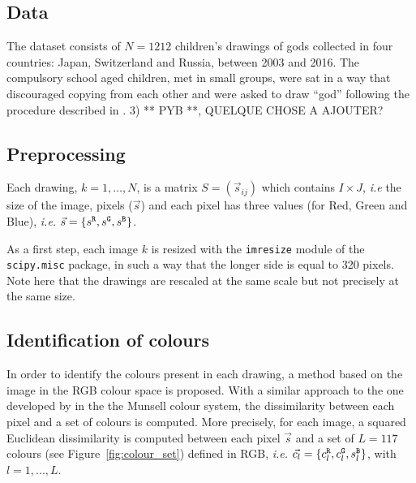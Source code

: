 \documentclass[11pt,a4paper]{article}
\begin{document}
\subsection{Data}
\label{sec:dataset}

The dataset consists of $N = 1212$ children's drawings of gods collected in four countries: Japan, Switzerland and Russia, between 2003 and 2016. The compulsory school aged children, met in small groups, were sat in a way that discouraged copying from each other and were asked to draw ``god'' following the procedure described in \citet{DandarovaRobertDessartSerbaevaEtAl2016}.
{\color{red} 3) ** PYB **, QUELQUE CHOSE A AJOUTER?}

\subsection{Preprocessing}
\label{sec:preprocessing}
Each drawing, $k = 1,\dots, N$, is a matrix $S = (\vec{s}_{ij})$ which contains $I \times J$, \textit{i.e} the size of the image,
pixels ($\vec{s}$) and each pixel has three values (for Red, Green and Blue), \textit{i.e.}
$\vec{s} = \{ s^{\tt \scriptstyle R}, s^{\tt \scriptstyle G}, s^{\tt \scriptstyle B} \}$.

As a first step, each image $k$ is resized with the {\tt imresize}
module of the {\tt scipy.misc} package, in such a way that the longer side is
equal to 320 pixels. Note here that the drawings are
rescaled at the same scale but not precisely at the same size.


\subsection{Identification of colours}
\label{sec:identification}




In order to identify the colours present in each drawing, a method based on the image in the RGB colour space is
proposed. With a similar approach to the one developed by
\cite{kimbaelee2007} in the the Munsell colour system, the dissimilarity
between each pixel and a set of colours is computed. More precisely, for
each image, a squared Euclidean dissimilarity is computed between each
pixel \(\vec{s}\) and a set of $L = 117$ colours (see Figure~\ref{fig:colour_set}) defined in RGB, \textit{i.e.}
\(\vec{c_l} = \{ c^{\tt \scriptstyle R}_{l}, c^{\tt \scriptstyle G}_{l}, s^{\tt \scriptstyle B}_{l} \}\),
with $l = 1, ..., L$.
\end{document}
